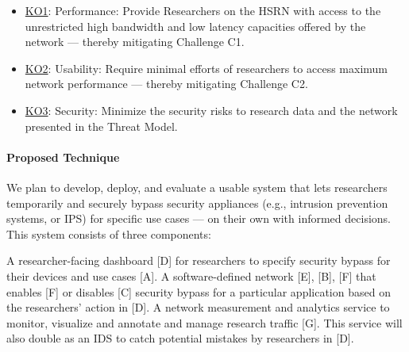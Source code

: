 \begin{itemize}
    \item \underline{KO1}: Performance: Provide Researchers on the HSRN with access to  the unrestricted high bandwidth and low latency capacities offered by the network — thereby mitigating Challenge C1.
    \item \underline{KO2}: Usability: Require minimal efforts of researchers to access maximum network performance — thereby mitigating Challenge C2.
    \item \underline{KO3}: Security: Minimize the security risks to research data and the network presented in the Threat Model.
\end{itemize}




\paragraph{Proposed Technique}
We plan to develop, deploy, and evaluate a usable system that lets researchers temporarily and securely bypass security appliances (e.g., intrusion prevention systems, or IPS) for specific use cases — on their own with informed decisions. This system consists of three components:

A researcher-facing dashboard [D] for researchers to specify security bypass for their devices and use cases [A].
A software-defined network [E], [B], [F] that enables [F] or disables [C] security bypass for a particular application based on the researchers' action in [D].
A network measurement and analytics service to monitor, visualize and annotate and manage research traffic [G]. This service will also double as an IDS to catch potential mistakes by researchers in [D].

